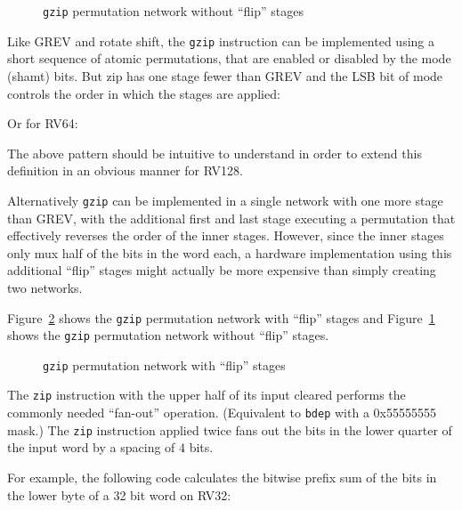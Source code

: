 \begin{figure}[t]
\begin{center}

\end{center}
\caption{\texttt{gzip} permutation network without ``flip'' stages}
\label{permnet-gzip-noflip}
\end{figure}

Like GREV and rotate shift, the {\tt gzip} instruction can be implemented using a short
sequence of atomic permutations, that are enabled or disabled by the mode (shamt)
bits. But zip has one stage fewer than GREV and the LSB bit of mode controls the order
in which the stages are applied:



Or for RV64:



The above pattern should be intuitive to understand in order to extend
this definition in an obvious manner for RV128.

Alternatively {\tt gzip} can be implemented in a single network with one more
stage than GREV, with the additional first and last stage executing a
permutation that effectively reverses the order of the inner stages. However,
since the inner stages only mux half of the bits in the word each, a hardware
implementation using this additional ``flip'' stages might actually be more
expensive than simply creating two networks.



Figure~\ref{permnet-gzip-flip} shows the {\tt gzip} permutation network with
``flip'' stages and Figure~\ref{permnet-gzip-noflip} shows the {\tt gzip}
permutation network without ``flip'' stages.

\begin{figure}[t]
\begin{center}

\end{center}
\caption{\texttt{gzip} permutation network with ``flip'' stages}
\label{permnet-gzip-flip}
\end{figure}

The \texttt{zip} instruction with the upper half of its input cleared performs
the commonly needed ``fan-out'' operation. (Equivalent to {\tt bdep} with a
0x55555555 mask.) The \texttt{zip} instruction applied twice fans out the bits
in the lower quarter of the input word by a spacing of 4 bits.

For example, the following code calculates the bitwise prefix sum of the bits
in the lower byte of a 32 bit word on RV32:

